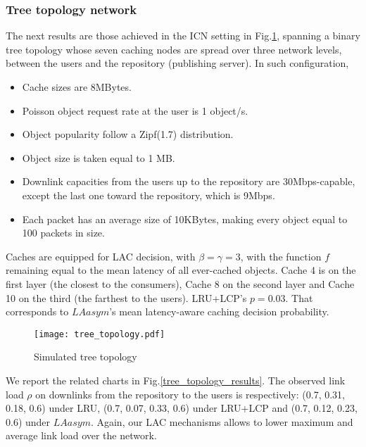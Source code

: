 \documentclass[conference]{IEEEtran}
\begin{document}
\subsubsection{Tree topology network}
The next results are those achieved in the ICN setting in Fig.\ref{fig:tree_topology}, spanning a binary tree topology whose
seven caching nodes are spread over three network levels, between the users and
the repository (publishing server). In such configuration, 
\begin{itemize}
	\item Cache sizes are 8MBytes.
	\item Poisson object request rate at the user is 1 object/s.
	\item Object popularity follow a Zipf(1.7) distribution.
	\item Object size is taken equal to 1 MB.
	\item Downlink capacities from the users up to the repository are 
	30Mbps-capable, except the last one toward the repository, which is 9Mbps.
	\item Each packet has an average size of 10KBytes, making every object equal to 100 packets in size.
\end{itemize}

Caches are equipped for LAC decision, with $\beta = \gamma = 3$, with  the function $f$ remaining equal to the mean latency of all ever-cached objects.
Cache 4 is on the first layer (the closest to the consumers), Cache 8 on the second layer and
Cache 10 on the third (the farthest to the users). 
LRU+LCP's $p = 0.03$. That corresponds to $LAasym$'s mean latency-aware caching decision probability. 
\begin{figure}[htbp] 
\centering
\texttt{[image: tree\_topology.pdf]}
\caption{Simulated tree topology } 
\label{fig:tree_topology} 
\end{figure}

We report the related charts in Fig.\ref{tree_topology_results}. 
The observed  link load $\rho$ on downlinks from the repository to the users is respectively: (0.7, 0.31, 0.18, 0.6) under LRU, 
(0.7, 0.07, 0.33, 0.6) under LRU+LCP and (0.7, 0.12, 0.23, 0.6) under $LAasym$. Again, our LAC mechanisms allows to lower maximum and average link load over the network. 
\end{document}
